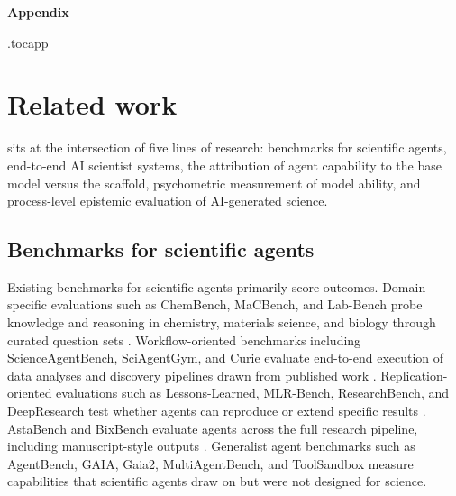 \clearpage

\begin{center}
{\LARGE\bfseries Appendix\par}
\end{center}
\vspace{1em}

\etocdepthtag.toc{app}
\begingroup
{}
\tableofcontents
\endgroup

\section{Related work} \label{app:related-work}

\corral sits at the intersection of five lines of research: benchmarks for scientific agents, end-to-end AI scientist systems, the attribution of agent capability to the base model versus the scaffold, psychometric measurement of model ability, and process-level epistemic evaluation of AI-generated science.

\subsection{Benchmarks for scientific agents}

Existing benchmarks for scientific agents primarily score outcomes. Domain-specific evaluations such as ChemBench, MaCBench, and Lab-Bench probe knowledge and reasoning in chemistry, materials science, and biology through curated question sets \autocite{mirza2025framework, alampara2025macbench, laurent2024lab}. Workflow-oriented benchmarks including ScienceAgentBench, SciAgentGym, and Curie evaluate end-to-end execution of data analyses and discovery pipelines drawn from published work \autocite{chen2024scienceagentbench, shen2026sciagentgym, cui2025curie}. Replication-oriented evaluations such as Lessons-Learned, MLR-Bench, ResearchBench, and DeepResearch test whether agents can reproduce or extend specific results \autocite{alampara2025lessons, chen2025mlr, liu2025researchbench, du2025deepresearch}. AstaBench and BixBench evaluate agents across the full research pipeline, including manuscript-style outputs \autocite{bragg2025astabench, mitchener2025bixbench0}. Generalist agent benchmarks such as AgentBench, GAIA, Gaia2, MultiAgentBench, and ToolSandbox \autocite{liu2023agentbench, mialon2023gaia, froger2026gaia2, zhu2025multiagentbench, lu2025toolsandbox} measure capabilities that scientific agents draw on but were not designed for science.


